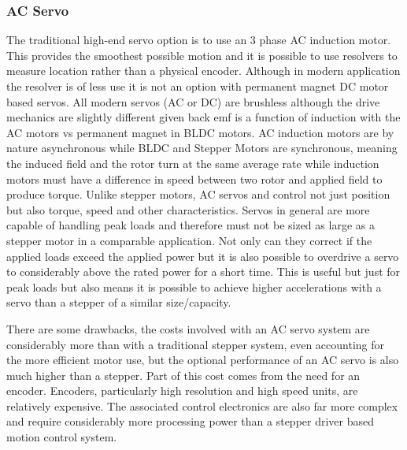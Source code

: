 \documentclass{article}
\begin{document}
\subsubsection{AC Servo}\label{acservo}
The traditional high-end servo option is to use an 3 phase AC induction motor. This provides the smoothest possible motion and it is possible to use resolvers to measure location rather than a physical encoder. Although in modern application the resolver is of less use it is not an option with permanent magnet DC motor based servos. All modern servos (AC or DC) are brushless although the drive mechanics are slightly different given back emf is a function of induction with the AC motors vs permanent magnet in BLDC motors. AC induction motors are by nature asynchronous while BLDC and Stepper Motors are synchronous, meaning the induced field and the rotor turn at the same average rate while induction motors must have a difference in speed between two rotor and applied field to produce torque. Unlike stepper motors, AC servos and control not just position but also torque, speed and other characteristics. Servos in general are more capable of handling peak loads and therefore must not be sized as large as a stepper motor in a comparable application. Not only can they correct if the applied loads exceed the applied power but it is also possible to overdrive a servo to considerably above the rated power for a short time. This is useful but just for peak loads but also means it is possible to achieve higher accelerations with a servo than a stepper of a similar size/capacity. 
\par
There are some drawbacks, the costs involved with an AC servo system are considerably more than with a traditional stepper system, even accounting for the more efficient motor use, but the optional performance of an AC servo is also much higher than a stepper. Part of this cost comes from the need for an encoder. Encoders, particularly high resolution and high speed units, are relatively expensive. The associated control electronics are also far more complex and require considerably more processing power than a stepper driver based motion control system. 
\end{document}
